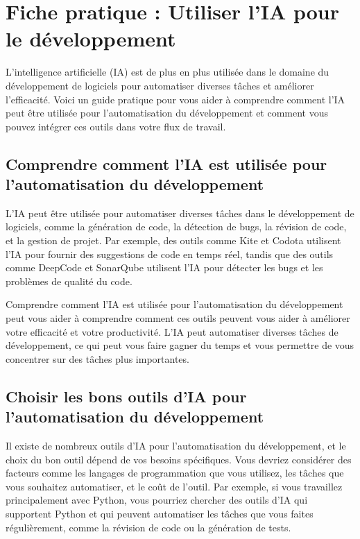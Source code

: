 \chapter{Fiche pratique : Utiliser l'IA pour le développement}

L'intelligence artificielle (IA) est de plus en plus utilisée dans le domaine du développement de logiciels pour automatiser diverses tâches et améliorer l'efficacité. Voici un guide pratique pour vous aider à comprendre comment l'IA peut être utilisée pour l'automatisation du développement et comment vous pouvez intégrer ces outils dans votre flux de travail.

\section{Comprendre comment l'IA est utilisée pour l'automatisation du développement}

L'IA peut être utilisée pour automatiser diverses tâches dans le développement de logiciels, comme la génération de code, la détection de bugs, la révision de code, et la gestion de projet. Par exemple, des outils comme Kite et Codota utilisent l'IA pour fournir des suggestions de code en temps réel, tandis que des outils comme DeepCode et SonarQube utilisent l'IA pour détecter les bugs et les problèmes de qualité du code.

Comprendre comment l'IA est utilisée pour l'automatisation du développement peut vous aider à comprendre comment ces outils peuvent vous aider à améliorer votre efficacité et votre productivité. L'IA peut automatiser diverses tâches de développement, ce qui peut vous faire gagner du temps et vous permettre de vous concentrer sur des tâches plus importantes.

\section{Choisir les bons outils d'IA pour l'automatisation du développement}

Il existe de nombreux outils d'IA pour l'automatisation du développement, et le choix du bon outil dépend de vos besoins spécifiques. Vous devriez considérer des facteurs comme les langages de programmation que vous utilisez, les tâches que vous souhaitez automatiser, et le coût de l'outil. Par exemple, si vous travaillez principalement avec Python, vous pourriez chercher des outils d'IA qui supportent Python et qui peuvent automatiser les tâches que vous faites régulièrement, comme la révision de code ou la génération de tests.

